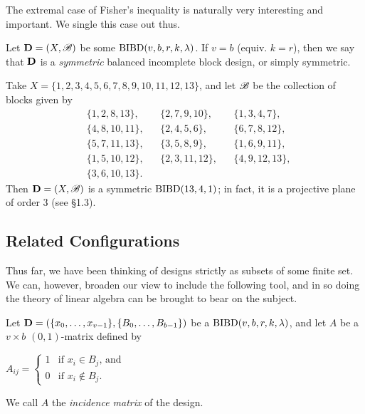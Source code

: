 \documentclass[../../../main]{subfiles}
\begin{document}
The extremal case of Fisher's inequality is naturally very interesting and important. We single this case out thus.

\begin{defin}\label{square-design}
 Let $\mathbf{D}=(X,\mathscr{B})$ be some $\text{BIBD}(v,b,r,k,\lambda)$. If $v = b$ (equiv. $k = r$), then we say that $\mathbf{D}$ is a {\it symmetric} balanced incomplete block design, or simply symmetric.
\end{defin}

\begin{ex}\label{fano}
 Take $X = \{1, 2, 3, 4, 5, 6, 7,8,9,10,11,12,13\}$, and let $\mathscr{B}$ be the collection of blocks given by
 \begin{align*}
  &\{1,2,8,13\}, & &\{2,7,9,10\}, & &\{1,3,4,7\}, \\
  &\{4,8,10,11\}, & &\{2,4,5,6\}, & &\{6,7,8,12\}, \\
  &\{5,7,11,13\}, & &\{3,5,8,9\}, & &\{1,6,9,11\}, \\
  &\{1,5,10,12\}, & &\{2,3,11,12\}, & &\{4,9,12,13\}, \\
  &\{3,6,10,13\}.
 \end{align*}
 Then $\mathbf{D}=(X,\mathscr{B})$ is a symmetric $\text{BIBD}(13,4,1)$; in fact, it is a projective plane of order 3 (see \S1.3).
\end{ex}

\dinkus

\subsection{Related Configurations}

Thus far, we have been thinking of designs strictly as subsets of some finite set. We can, however, broaden our view to include the following tool, and in so doing the theory of linear algebra can be brought to bear on the subject.

\begin{defin}\label{incidence}
 Let $\mathbf{D}=(\{x_0, \dots, x_{v-1}\},\{B_0, \dots, B_{b-1}\})$ be a $\text{BIBD}(v,b,r,k,\lambda)$, and let $A$ be a $v \times b$ $(0,1)$-matrix defined by
 \begin{defenum}
 \item $A_{ij} = 
 \begin{cases}
  1 & \text{if } x_i \in B_j \text{, and} \\
  0 & \text{if } x_i \not\in B_j.
 \end{cases}$
 \end{defenum}
 We call $A$ the {\it incidence matrix} of the design.
\end{defin}
\end{document}
